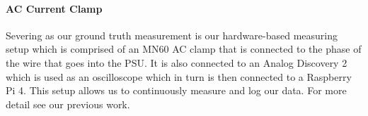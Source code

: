 \paragraph{AC Current Clamp}
Severing as our ground truth measurement is our hardware-based measuring setup which is comprised of an MN60 AC clamp that is connected to the phase of the wire that goes into the PSU. It is also connected to an Analog Discovery 2 which is used as an oscilloscope which in turn is then connected to a Raspberry Pi 4. This setup allows us to continuously measure and log our data. For more detail see our previous work\cite{biksbois}.

